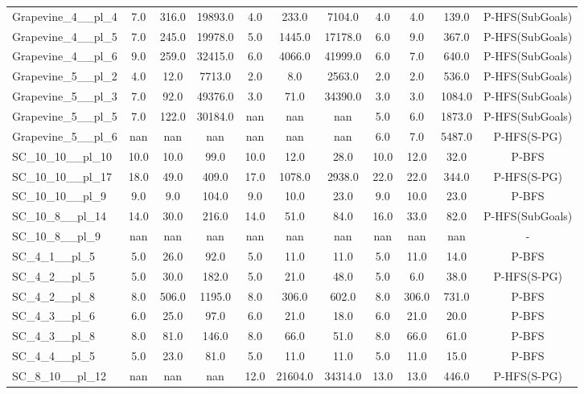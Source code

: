 \begin{table}[!ht]
\begin{tabular}{l|ccc|ccc|cccc}
Grapevine\_4\_\_pl\_4 & 7.0 & 316.0 & 19893.0 & 4.0 & 233.0 & 7104.0 & 4.0 & 4.0 & 139.0 & P-HFS(SubGoals) \\
Grapevine\_4\_\_pl\_5 & 7.0 & 245.0 & 19978.0 & 5.0 & 1445.0 & 17178.0 & 6.0 & 9.0 & 367.0 & P-HFS(SubGoals) \\
Grapevine\_4\_\_pl\_6 & 9.0 & 259.0 & 32415.0 & 6.0 & 4066.0 & 41999.0 & 6.0 & 7.0 & 640.0 & P-HFS(SubGoals) \\
Grapevine\_5\_\_pl\_2 & 4.0 & 12.0 & 7713.0 & 2.0 & 8.0 & 2563.0 & 2.0 & 2.0 & 536.0 & P-HFS(SubGoals) \\
Grapevine\_5\_\_pl\_3 & 7.0 & 92.0 & 49376.0 & 3.0 & 71.0 & 34390.0 & 3.0 & 3.0 & 1084.0 & P-HFS(SubGoals) \\
Grapevine\_5\_\_pl\_5 & 7.0 & 122.0 & 30184.0 & nan & nan & nan & 5.0 & 6.0 & 1873.0 & P-HFS(SubGoals) \\
Grapevine\_5\_\_pl\_6 & nan & nan & nan & nan & nan & nan & 6.0 & 7.0 & 5487.0 & P-HFS(S-PG) \\
SC\_10\_10\_\_pl\_10 & 10.0 & 10.0 & 99.0 & 10.0 & 12.0 & 28.0 & 10.0 & 12.0 & 32.0 & P-BFS \\
SC\_10\_10\_\_pl\_17 & 18.0 & 49.0 & 409.0 & 17.0 & 1078.0 & 2938.0 & 22.0 & 22.0 & 344.0 & P-HFS(S-PG) \\
SC\_10\_10\_\_pl\_9 & 9.0 & 9.0 & 104.0 & 9.0 & 10.0 & 23.0 & 9.0 & 10.0 & 23.0 & P-BFS \\
SC\_10\_8\_\_pl\_14 & 14.0 & 30.0 & 216.0 & 14.0 & 51.0 & 84.0 & 16.0 & 33.0 & 82.0 & P-HFS(SubGoals) \\
SC\_10\_8\_\_pl\_9 & nan & nan & nan & nan & nan & nan & nan & nan & nan & - \\
SC\_4\_1\_\_pl\_5 & 5.0 & 26.0 & 92.0 & 5.0 & 11.0 & 11.0 & 5.0 & 11.0 & 14.0 & P-BFS \\
SC\_4\_2\_\_pl\_5 & 5.0 & 30.0 & 182.0 & 5.0 & 21.0 & 48.0 & 5.0 & 6.0 & 38.0 & P-HFS(S-PG) \\
SC\_4\_2\_\_pl\_8 & 8.0 & 506.0 & 1195.0 & 8.0 & 306.0 & 602.0 & 8.0 & 306.0 & 731.0 & P-BFS \\
SC\_4\_3\_\_pl\_6 & 6.0 & 25.0 & 97.0 & 6.0 & 21.0 & 18.0 & 6.0 & 21.0 & 20.0 & P-BFS \\
SC\_4\_3\_\_pl\_8 & 8.0 & 81.0 & 146.0 & 8.0 & 66.0 & 51.0 & 8.0 & 66.0 & 61.0 & P-BFS \\
SC\_4\_4\_\_pl\_5 & 5.0 & 23.0 & 81.0 & 5.0 & 11.0 & 11.0 & 5.0 & 11.0 & 15.0 & P-BFS \\
SC\_8\_10\_\_pl\_12 & nan & nan & nan & 12.0 & 21604.0 & 34314.0 & 13.0 & 13.0 & 446.0 & P-HFS(S-PG) \\

\end{tabular}
\end{table}
